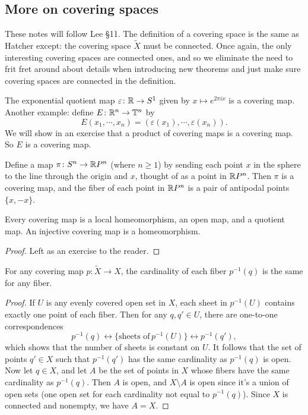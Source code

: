\subsection{More on covering spaces}
These notes will follow Lee \S 11.
\vspace{0.25cm}
\newline
The definition of a covering space is the same as Hatcher except: the covering space $\widetilde X$ must be connected. Once again, the only interesting covering spaces are connected ones, and so we eliminate the need to frit fret around about details when introducing new theorems and just make sure covering spaces are connected in the definition.
\begin{example}
    The exponential quotient map $\varepsilon \colon \mathbb{R} \to S^{1} $ given by $x \mapsto e^{2\pi ix}$ is a covering map. Another example: define $E \colon \mathbb{R}^n \to \mathbb{T}^n$ by \[
        E(x_1,\cdots,x_n)=(\varepsilon(x_1),\cdots,\varepsilon(x_n)).
    \] We will show in an exercise that a product of covering maps is a covering map. So $E$ is a covering map.
\end{example}
\begin{example}
    Define a map $\pi \colon S^n \to \mathbb{R} P^n$ (where $n\geq 1$) by sending each point $x$ in the sphere to the line through the origin and $x$, thought of as a point in $\mathbb{R} P^n$. Then $\pi$ is a covering map, and the fiber of each point in $\mathbb{R} P^n$ is a pair of antipodal points $\{x,-x\} $.
\end{example}
\begin{lemma}
   Every covering map is a local homeomorphism, an open map, and a quotient map. An injective covering map is a homeomorphism.
\end{lemma}
\begin{proof}
    Left as an exercise to the reader.
\end{proof}
\begin{prop}
    For any covering map $p \colon \widetilde X \to X$, the cardinality of each fiber $p ^{-1}(q)$ is the same for any fiber.
\end{prop}
\begin{proof}
    If $U$ is any evenly covered open set in $X$, each sheet in $p ^{-1}(U)$ contains exactly one point of each fiber. Then for any $q,q'\in U$, there are one-to-one correspondences \[
        p ^{-1}(q) \longleftrightarrow \{\text{sheets of}\,p ^{-1}(U)\} \longleftrightarrow p ^{-1}(q'),
    \] which shows that the number of sheets is constant on $U$. It follows that the set of points $q'\in X$ such that $p ^{-1}(q')$ has the same cardinality as $p ^{-1}(q)$ is open. Now let $q\in X$, and let $A$ be the set of points in $X$ whose fibers have the same cardinality as $p ^{-1}(q)$. Then $A$ is open, and $X\setminus A$ is open since it's a union of open sets (one open set for each cardinality not equal to $p ^{-1}(q)$). Since $X$ is connected and nonempty, we have $A=X$.
\end{proof}
